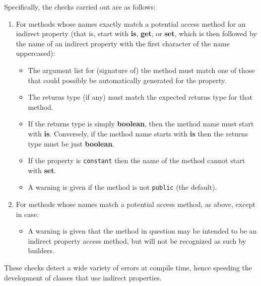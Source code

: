 Specifically, the checks carried out are as follows:
\begin{enumerate}
\item For methods whose names exactly match a potential access method for
an indirect property (that is, start with \textbf{is}, \textbf{get},
or \textbf{set}, which is then followed by the name of an indirect
property with the first character of the name uppercased):
\begin{itemize}
\item The argument list for (signature of) the method must match one of
those that could possibly be automatically generated for the property.
\item The returns type (if any) must match the expected returns type for
that method.
\item If the returns type is simply \textbf{boolean}, then the method name
must start with \textbf{is}.
Conversely, if the method name starts with \textbf{is} then the returns
type must be just \textbf{boolean}.
\item If the property is \texttt{constant} then the name of the method
cannot start with \textbf{set}.
\item A warning is given if the method is not \texttt{public} (the default).
\end{itemize}
\item For methods whose names match a potential access method, as above,
except in case:
\begin{itemize}
\item A warning is given that the method in question may be intended to
be an indirect property access method, but will not be recognized as
such by builders.
\end{itemize}
\end{enumerate}
 These checks detect a wide variety of errors at compile time, hence
speeding the development of classes that use indirect properties.
